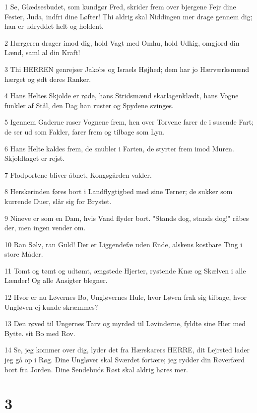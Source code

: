 \par 1 Se, Glædsesbudet, som kundgør Fred, skrider frem over bjergene Fejr dine Fester, Juda, indfri dine Løfter! Thi aldrig skal Niddingen mer drage gennem dig; han er udryddet helt og holdent.
\par 2 Hærgeren drager imod dig, hold Vagt med Omhu, hold Udkig, omgjord din Lænd, saml al din Kraft!
\par 3 Thi HERREN genrejser Jakobs og Israels Højhed; dem har jo Hærværksmænd hærget og ødt deres Ranker.
\par 4 Hans Heltes Skjolde er røde, hans Stridsmænd skarlagenklædt, hans Vogne funkler af Stål, den Dag han ruster og Spydene svinges.
\par 5 Igennem Gaderne raser Vognene frem, hen over Torvene farer de i susende Fart; de ser ud som Fakler, farer frem og tilbage som Lyn.
\par 6 Hans Helte kaldes frem, de snubler i Farten, de styrter frem imod Muren. Skjoldtaget er rejst.
\par 7 Flodportene bliver åbnet, Kongsgården vakler.
\par 8 Herskerinden føres bort i Landflygtigbed med sine Terner; de sukker som kurrende Duer, slår sig for Brystet.
\par 9 Nineve er som en Dam, hvis Vand flyder bort. "Stands dog, stands dog!" råbes der, men ingen vender om.
\par 10 Ran Sølv, ran Guld! Der er Liggendefæ uden Ende, alskens kostbare Ting i store Måder.
\par 11 Tomt og tømt og udtømt, ængstede Hjerter, rystende Knæ og Skælven i alle Lænder! Og alle Ansigter blegner.
\par 12 Hvor er nu Løvernes Bo, Ungløvernes Hule, hvor Løven frak sig tilbage, hvor Ungløven ej kunde skræmmes?
\par 13 Den røved til Ungernes Tarv og myrded til Løvinderne, fyldte sine Hier med Bytte. sit Bo med Rov.
\par 14 Se, jeg kommer over dig, lyder det fra Hærskarers HERRE, dit Lejrsted lader jeg gå op i Røg. Dine Ungløver skal Sværdet fortære; jeg rydder din Røverfærd bort fra Jorden. Dine Sendebuds Røst skal aldrig høres mer.

\chapter{3}

